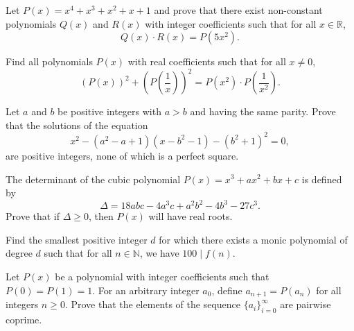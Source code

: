 \documentclass[12pt,a4paper]{memoir}
\theoremstyle{definition}
\begin{document}
\begin{question}[name={1995 Austrian--Polish}]
	Let $P(x)=x^4+x^3+x^2+x+1$ and prove that there exist non-constant polynomials $Q(x)$ and $R(x)$ with integer coefficients such that for all $x\in\mathbb R$,
	\[Q(x) \cdot R(x) = P(5x^2).\]
\end{question}


\begin{question}[name={1995 Austrian--Polish}]
	Find all polynomials $P(x)$ with real coefficients such that for all $x\neq 0$,
	\[(P(x))^2 + \left(P\left(\frac{1}{x}\right)\right)^2 = P(x^2) \cdot P\left(\frac{1}{x^2}\right).\]
\end{question}


\begin{question}[name={1995 Balkan}]
	Let $a$ and $b$ be positive integers with $a > b$ and having the same parity. Prove that the solutions of the equation \[ x^2 - (a^2 - a + 1)(x - b^2 - 1) - (b^2 + 1)^2 = 0, \] are positive integers, none of which is a perfect square.
\end{question}



\begin{question}[name={1998 Iran}]
	The determinant of the cubic polynomial $P(x)=x^3+ax^2+bx+c$ is defined by \[\Delta = 18abc - 4a^3c + a^2b^2 -4b^3 - 27c^3.\]
	Prove that if $\Delta \geq 0$, then $P(x)$ will have real roots.
\end{question}


\begin{question}[name={1998 Iran}]
	Find the smallest positive integer $d$ for which there exists a monic polynomial of degree $d$ such that for all $n\in\mathbb N$, we have $100 \mid f(n)$.
\end{question}

\begin{question}
	Let $P(x)$ be a polynomial with integer coefficients such that $P(0)=P(1)=1$. For an arbitrary integer $a_0$, define $a_{n+1} = P(a_n)$ for all integers $n \geq 0$. Prove that the elements of the sequence $\{a_i\}_{i=0}^\infty$ are pairwise coprime.
\end{question}
\end{document}
